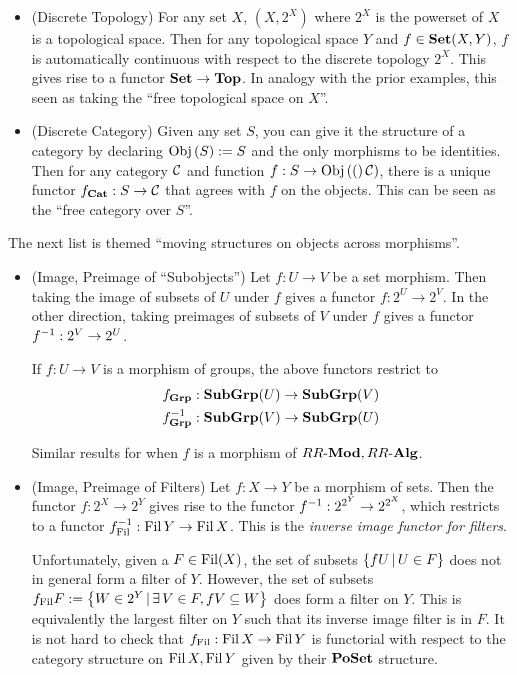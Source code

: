 \begin{eg}
\begin{itemize}
    \item (Discrete Topology)
    For any set $X$, $(X,2^X)$ where $2^X$ is the powerset of $X$
    is a topological space. 
    Then for any topological space $Y$ and $f \in \mathbf{Set}(X,Y)$,
    $f$ is automatically continuous with respect to the discrete topology $2^X$.
    This gives rise to a functor $\mathbf{Set} \to \mathbf{Top}$.
    In analogy with the prior examples, 
    this seen as taking the ``free topological space on $X$''.

    \item (Discrete Category)
    Given any set $S$, 
    you can give it the structure of a category by
    declaring $\mathrm{Obj}\left(S\right) := S$ and the only morphisms to be identities. 
    Then for any category $\mathcal{C}$ and function $f : S \to \mathrm{Obj}\left((\right)\mathcal{C})$,
    there is a unique functor $f_{\mathbf{Cat}} : S \to \mathcal{C}$ that 
    agrees with $f$ on the objects. 
    This can be seen as the ``free category over $S$''.

  \end{itemize}

  The next list is themed ``moving structures on objects across morphisms''.
  \begin{itemize}
    \item (Image, Preimage of ``Subobjects'')
    Let $f : U \to V$ be a set morphism. 
    Then taking the image of subsets of $U$ under $f$
    gives a functor $f : 2^U \to 2^V$.
    In the other direction,
    taking preimages of subsets of $V$ under $f$ gives 
    a functor $f^{-1} : 2^V \to 2^U$.

    If $f : U \to V$ is a morphism of groups,
    the above functors restrict to \begin{align*}
      f_{\mathbf{Grp}} : \mathbf{Sub}\mathbf{Grp}(U) \to \mathbf{Sub}\mathbf{Grp}(V) \\
      f^{-1}_{\mathbf{Grp}} : \mathbf{Sub}\mathbf{Grp}(V) \to \mathbf{Sub}\mathbf{Grp}(U)
    \end{align*}

    Similar results for when $f$ is a morphism of $RR\text{-}\mathbf{Mod}, RR\text{-}\mathbf{Alg}$.

    \item (Image, Preimage of Filters)
    Let $f : X \to Y$ be a morphism of sets. 
    Then the functor $f : 2^X \to 2^Y$ gives rise to 
    the functor $f^{-1} : 2^{2^Y} \to 2^{2^X}$,
    which restricts to a functor $f^{-1}_{\operatorname{Fil}} : \operatorname{Fil} Y \to \operatorname{Fil} X$.
    This is the \emph{inverse image functor for filters}.
    
    Unfortunately, given a $F \in \operatorname{Fil}(X)$,
    the set of subsets $\left\{f U \,|\, U \in F\right\}$ does not
    in general form a filter of $Y$. 
    However, 
    the set of subsets 
    $f_{\operatorname{Fil}} F := \left\{W \in 2^Y \,|\, \exists\, V \in F, f V \subseteq W \right\}$ 
    does form a filter on $Y$. 
    This is equivalently the largest filter on $Y$ such that 
    its inverse image filter is in $F$.
    It is not hard to check that 
    $f_{\operatorname{Fil}} : \operatorname{Fil} X \to \operatorname{Fil} Y$ is functorial with respect to 
    the category structure on $\operatorname{Fil} X, \operatorname{Fil} Y$ given by 
    their $\mathbf{PoSet}$ structure.


\end{itemize}
\end{eg}
